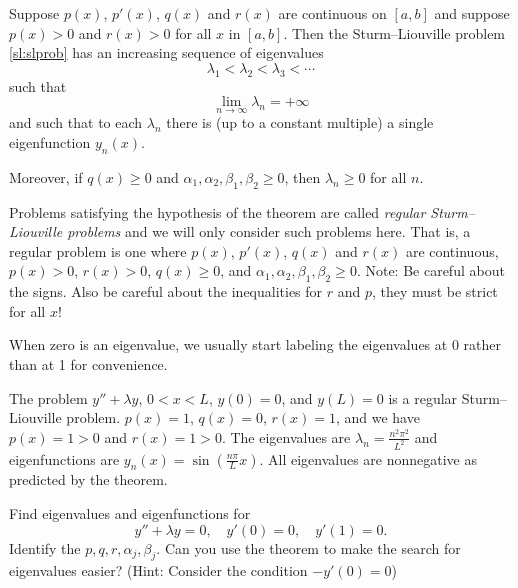 \begin{theorem} \label{sl:slregthm}
Suppose $p(x)$, $p'(x)$, $q(x)$ and $r(x)$ are continuous on $[a,b]$
and suppose $p(x) > 0$ and $r(x) > 0$ for all $x$ in $[a,b]$.
Then the Sturm--Liouville problem \eqref{sl:slprob}
has an increasing sequence of eigenvalues
\begin{equation*}
\lambda_1 < \lambda_2 < \lambda_3 < \cdots 
\end{equation*}
such that
\begin{equation*}
\lim_{n \to \infty} \lambda_n = +\infty
\end{equation*}
and such that to each $\lambda_n$ there is (up to a constant multiple)
a single eigenfunction $y_n(x)$. 

Moreover, if $q(x) \geq 0$ and $\alpha_1, \alpha_2, \beta_1, \beta_2 \geq 0$,
then $\lambda_n \geq 0$ for all $n$.
\end{theorem}

Problems satisfying the hypothesis of the
theorem are called
\emph{regular Sturm--Liouville problems}%
and we will only consider such problems here.
That is, a regular problem is one where
$p(x)$, $p'(x)$, $q(x)$ and $r(x)$ are continuous, $p(x) > 0$, $r(x) > 0$,
$q(x) \geq 0$, and $\alpha_1, \alpha_2, \beta_1, \beta_2 \geq 0$.
Note: Be careful about the signs.  Also be careful about the inequalities
for $r$ and $p$, they
must be strict for all $x$!

When zero
is an eigenvalue, we usually
start labeling the eigenvalues at 0 rather than at 1 for convenience.

\begin{example}
The problem $y''+\lambda y$, $0 < x < L$, $y(0) = 0$, and $y(L) = 0$
is a regular Sturm--Liouville problem.  $p(x) = 1$, $q(x) = 0$, $r(x) = 1$,
and we have $p(x) = 1 > 0$ and $r(x) = 1 > 0$.
The eigenvalues are $\lambda_n = \frac{n^2 \pi^2}{L^2}$ and eigenfunctions
are $y_n(x) = \sin(\frac{n\pi}{L} x)$.  All eigenvalues are nonnegative as
predicted by the theorem.
\end{example}

\begin{exercise}
Find eigenvalues and eigenfunctions for
\begin{equation*}
y'' + \lambda y = 0, \quad y'(0) = 0, \quad y'(1) = 0.
\end{equation*}
Identify
the $p, q, r, \alpha_j, \beta_j$.
Can you use the theorem to make the search for eigenvalues easier?
(Hint: Consider the condition $-y'(0)=0$)
\end{exercise}

